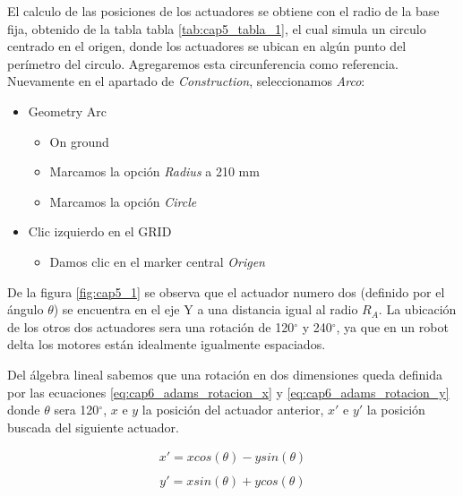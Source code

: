         
        El calculo de las posiciones de los actuadores se obtiene con el radio de la base fija, obtenido de la tabla tabla \eqref{tab:cap5_tabla_1}, el cual simula un circulo centrado en el origen, donde los actuadores se ubican en algún punto del perímetro del circulo. Agregaremos esta circunferencia como referencia. Nuevamente en el apartado de \textit{Construction}, seleccionamos \textit{Arco}:
        
        \begin{scope}
            \renewcommand{\labelitemi}{\blacklozenge}
            \renewcommand{\labelitemii}{\checkmark}
            \begin{itemize}
                \item Geometry Arc
                \begin{itemize}
                    \item On ground
                    \item Marcamos la opción \textit{Radius} a 210 mm
                    \item Marcamos la opción \textit{Circle}
                \end{itemize}
                \item Clic izquierdo en el GRID
                \begin{itemize}
                    \item Damos clic en el marker central \textit{Origen}
                \end{itemize}
            \end{itemize}
        \end{scope}
        
        
        De la figura \eqref{fig:cap5_1} se observa que el actuador numero dos (definido por el ángulo $\theta$) se encuentra en el eje Y a una distancia igual al radio $R_{A}$. La ubicación de los otros dos actuadores sera una rotación de 120$^{\circ}$ y 240$^{\circ}$, ya que en un robot delta los motores están idealmente igualmente espaciados.
        
        Del álgebra lineal sabemos que una rotación en dos dimensiones queda definida por las ecuaciones \eqref{eq:cap6_adams_rotacion_x} y \eqref{eq:cap6_adams_rotacion_y} donde $\theta$ sera 120$^{\circ}$, $x$ e $y$ la posición del actuador anterior, $x'$ e $y'$ la posición buscada del siguiente actuador.
        
        
        \begin{align} 
            x'= xcos(\theta) - ysin(\theta) \\
            \label{eq:cap6_adams_rotacion_x}
        \end{align}
        \begin{align} 
            y'= xsin(\theta) + ycos(\theta)
            \label{eq:cap6_adams_rotacion_y}
        \end{align}
        
